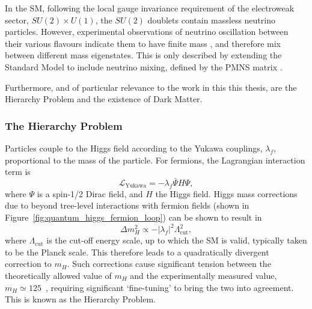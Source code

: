 In the SM, following the local gauge invariance requirement of the electroweak
sector, $SU(2)\times U(1)$, the $SU(2)$ doublets contain
massless neutrino particles. However, experimental observations of neutrino
oscillation between their various flavours indicate them to have finite mass
\cite{PhysRevLett.81.1562,PhysRevLett.89.011302}, and
therefore mix between different mass eigenstates. This is only described
by extending the Standard Model to include neutrino mixing, defined by the
PMNS matrix \cite{Altarelli:2002hx}.

Furthermore, and of particular relevance to the work in this this thesis, are
the Hierarchy Problem and the existence of Dark Matter.

\subsubsection{The Hierarchy Problem}


Particles couple to the Higgs field according to the Yukawa couplings,
$\lambda_f$,
proportional to the mass of the particle. For fermions, the Lagrangian
interaction term is
% 
\begin{equation}
\mathcal{L}_\text{Yukawa} = - \lambda_f \bar{\Psi}H\Psi,
\end{equation}
% 
where $\Psi$ is a spin-1/2 Dirac field, and $H$ the Higgs field. Higgs mass
corrections due to beyond tree-level interactions with fermion
fields (shown in Figure~\ref{fig:quantum_higgs_fermion_loop}) can be shown to
result in
% 
\begin{equation}
\Delta m_H^2 \propto -|\lambda_f|^2 \Lambda_{\text{cut}}^2,
\label{eq:higgs_corr_hierarchy}
\end{equation}
% 
where $\Lambda_{\text{cut}}$ is the cut-off energy scale, up to which the SM is
valid, typically taken to be the Planck scale. This therefore leads to a
quadratically
divergent correction to $m_H$. Such corrections cause significant tension
between the theoretically allowed value of $m_H$ and the experimentally
measured value, $m_H \simeq 125$~\gev \cite{PhysRevLett.114.191803},
requiring significant `fine-tuning' to bring the two into agreement. This
is known as the Hierarchy Problem.

